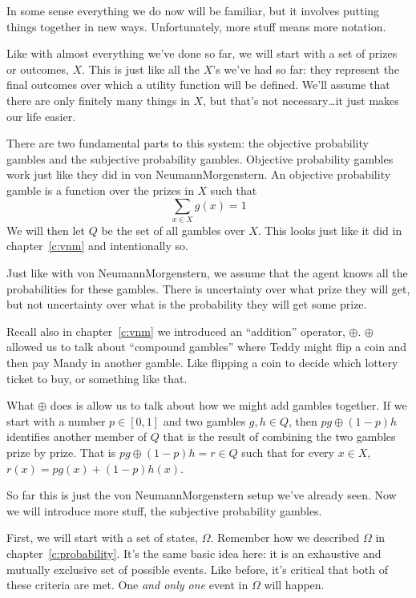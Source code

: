 In some sense everything we do now will be familiar, but it involves putting things together in new ways.  Unfortunately, more stuff means more notation.

Like with almost everything we've done so far, we will start with a set of prizes or outcomes, $X$.  This is just like all the $X$'s we've had so far: they represent the final outcomes over which a utility function will be defined.  We'll assume that there are only finitely many things in $X$, but that's not necessary\dots it just makes our life easier.

There are two fundamental parts to this system: the objective probability gambles and the subjective probability gambles. Objective probability gambles work just like they did in von Neumann\breakslash Morgenstern.  An objective probability gamble is a function over the prizes in $X$ such that \[\sum_{x \in X} g(x) = 1\]
We will then let $Q$ be the set of all gambles over $X$. This looks just like it did in chapter~\ref{c:vnm} and intentionally so.

Just like with von Neumann\breakslash Morgenstern, we assume that the agent knows all the probabilities for these gambles.   There is uncertainty over what prize they will get, but not uncertainty over what is the probability they will get some prize.

Recall also in chapter~\ref{c:vnm} we introduced an ``addition'' operator, $\oplus$.  $\oplus$ allowed us to talk about ``compound gambles'' where Teddy might flip a coin and then pay Mandy in another gamble.  Like flipping a coin to decide which lottery ticket to buy, or something like that.

What $\oplus$ does is allow us to talk about how we might add gambles together.  If we start with a number $p \in [0,1]$ and two gambles $g, h \in Q$, then $p g \oplus (1-p) h$ identifies another member of $Q$ that is the result of combining the two gambles prize by prize.  That is $p g \oplus (1-p) h = r \in Q$ such that for every $x \in X$, $r(x) = p g(x) + (1-p) h(x)$.

So far this is just the von Neumann\breakslash Morgenstern setup we've already seen. Now we will introduce more stuff, the subjective probability gambles.  

First, we will start with a set of states, $\Omega$.  Remember how we described $\Omega$ in chapter~\ref{c:probability}.  It's the same basic idea here: it is an exhaustive and mutually exclusive set of possible events.  Like before, it's critical that both of these criteria are met.  One {\it and only one} event in $\Omega$ will happen.

